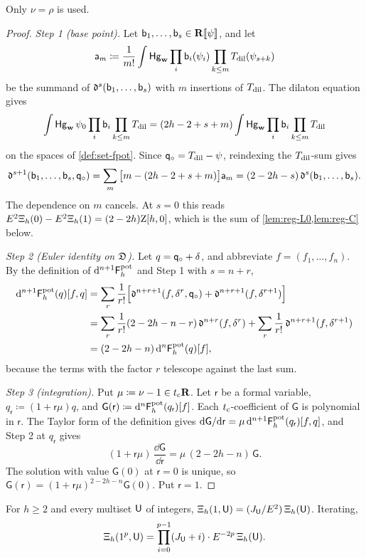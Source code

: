 Only $\nu=\rho$ is used.

\begin{proof}
\emph{Step 1 (base point).} Let $\mathsf{b}_1,\dots,\mathsf{b}_s\in\mathbf{R}[\![ \psi ]\!]$, and let
\[
\mathsf{a}_m\coloneqq\frac{1}{m!}\int\mathsf{Hg}_{\mathbf{w}}\prod_i \mathsf{b}_i(\psi_i)\prod_{k\leq m}T_{\mathrm{dil}}(\psi_{s+k})
\]
be the summand of $\mathfrak{d}^s(\mathsf{b}_1,\dots,\mathsf{b}_s)$ with $m$ insertions of $T_{\mathrm{dil}}$. The dilaton equation gives
\[
\int\mathsf{Hg}_{\mathbf{w}}\,\psi_0\prod_i \mathsf{b}_i\prod_{k\leq m}T_{\mathrm{dil}}=(2h-2+s+m)\int\mathsf{Hg}_{\mathbf{w}}\prod_i \mathsf{b}_i\prod_{k\leq m}T_{\mathrm{dil}}
\]
on the spaces of \cref{def:set-fpot}. Since $\mathsf{q}_{\circ}=T_{\mathrm{dil}}-\psi$, reindexing the $T_{\mathrm{dil}}$-sum gives
\[
\mathfrak{d}^{s+1}(\mathsf{b}_1,\dots,\mathsf{b}_s,\mathsf{q}_{\circ})=\sum_m\big[m-(2h-2+s+m)\big]\mathsf{a}_m=(2-2h-s)\,\mathfrak{d}^s(\mathsf{b}_1,\dots,\mathsf{b}_s).
\]
The dependence on $m$ cancels. At $s=0$ this reads $E^2\Xi_h(0)-E^2\Xi_h(1)=(2-2h)\mathrm{Z}[h,0]$, which is the sum of \cref{lem:reg-L0,lem:reg-C} below.

\emph{Step 2 (Euler identity on $\mathfrak{D}$).} Let $q=\mathsf{q}_{\circ}+\delta$, and abbreviate $f=(f_1,\dots,f_n)$. By the definition of $\mathrm{d}^{n+1}\mathsf{F}^{\mathrm{pot}}_h$ and Step 1 with $s=n+r$,
\begin{align*}
\mathrm{d}^{n+1}\mathsf{F}^{\mathrm{pot}}_h(q)[f,q]
&=\sum_{r}\frac{1}{r!}\Big[\mathfrak{d}^{n+r+1}(f,\delta^r,\mathsf{q}_{\circ})+\mathfrak{d}^{n+r+1}(f,\delta^{r+1})\Big]\\
&=\sum_r\frac{1}{r!}(2-2h-n-r)\,\mathfrak{d}^{n+r}(f,\delta^r)+\sum_r\frac{1}{r!}\,\mathfrak{d}^{n+r+1}(f,\delta^{r+1})\\
&=(2-2h-n)\,\mathrm{d}^n\mathsf{F}^{\mathrm{pot}}_h(q)[f],
\end{align*}
because the terms with the factor $r$ telescope against the last sum.

\emph{Step 3 (integration).} Put $\mu\coloneqq\nu-1\in t_{\mathrm{c}}\mathbf{R}$. Let $\mathsf{r}$ be a formal variable, $q_{\mathsf{r}}\coloneqq(1+\mathsf{r}\mu)q$, and $\mathsf{G}(\mathsf{r})\coloneqq\mathrm{d}^n\mathsf{F}^{\mathrm{pot}}_h(q_{\mathsf{r}})[f]$. Each $t_{\mathrm{c}}$-coefficient of $\mathsf{G}$ is polynomial in $\mathsf{r}$. The Taylor form of the definition gives $\mathrm{d}\mathsf{G}/\mathrm{d}\mathsf{r}=\mu\,\mathrm{d}^{n+1}\mathsf{F}^{\mathrm{pot}}_h(q_{\mathsf{r}})[f,q]$, and Step 2 at $q_{\mathsf{r}}$ gives
\[
(1+\mathsf{r}\mu)\,\frac{\dd\mathsf{G}}{\dd\mathsf{r}}=\mu\,(2-2h-n)\,\mathsf{G}.
\]
The solution with value $\mathsf{G}(0)$ at $\mathsf{r}=0$ is unique, so $\mathsf{G}(\mathsf{r})=(1+\mathsf{r}\mu)^{2-2h-n}\mathsf{G}(0)$. Put $\mathsf{r}=1$.
\end{proof}

\begin{lem}
\label{lem:reg-string}
For $h\geq 2$ and every multiset $\mathsf{U}$ of integers, $\Xi_h(1,\mathsf{U})=(J_{\mathsf{U}}/E^2)\,\Xi_h(\mathsf{U})$. Iterating,
\[
\Xi_h(1^p,\mathsf{U})=\prod_{i=0}^{p-1}(J_{\mathsf{U}}+i)\cdot E^{-2p}\,\Xi_h(\mathsf{U}).
\]
\end{lem}

